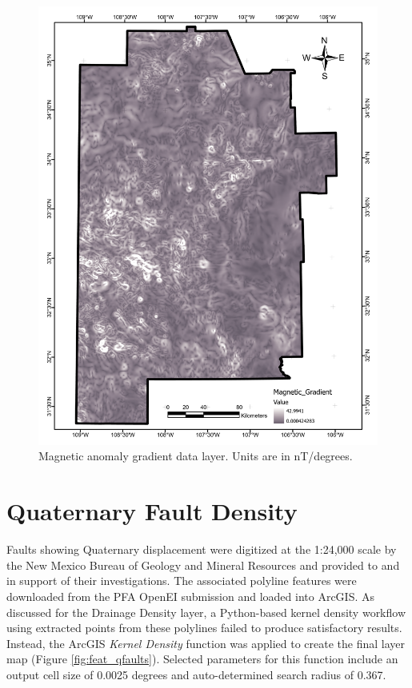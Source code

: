 \begin{figure}[H]
\centering
\includegraphics[width=0.75\linewidth]{templates/images/Figure-MagneticGradient.pdf}
\caption[Magnetic anomaly gradient data layer]{Magnetic anomaly gradient data layer. Units are in nT/degrees.}
\label{fig:feat_magnetic_gradient}
\end{figure}
\pagebreak

\section{Quaternary Fault Density}\label{app:dl_quat_fault_density}
Faults showing Quaternary displacement were digitized at the 1:24,000 scale by the New Mexico Bureau of Geology and Mineral Resources and provided to \citet{bielicki_hydrogeolgic_2015} and \citet{pepin_new_2018} in support of their investigations. The associated polyline features were downloaded from the PFA OpenEI submission \citep{kelley_geothermal_2015} and loaded into ArcGIS. As discussed for the Drainage Density layer, a Python-based kernel density workflow using extracted points from these polylines failed to produce satisfactory results. Instead, the ArcGIS \textit{Kernel Density} function was applied to create the final layer map (Figure \ref{fig:feat_qfaults}). Selected parameters for this function include an output cell size of 0.0025 degrees and auto-determined search radius of 0.367.
\vfill
\pagebreak

